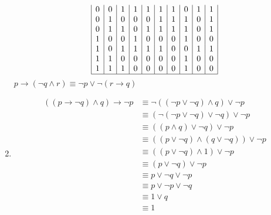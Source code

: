 \documentclass[12pt]{article}
\newcommand{\enumset}[1]{\setcounter{enumi}{#1}}
\begin{document}
\begin{enumerate}
\[\begin{array}{|*{10}{c|}}
					0 & 0 & 1 & 1 & 1 & 1 & 1 & 0 & 1 & 1 \\
					0 & 1 & 0 & 0 & 0 & 1 & 1 & 1 & 0 & 1 \\
					0 & 1 & 1 & 0 & 1 & 1 & 1 & 1 & 0 & 1 \\
					1 & 0 & 0 & 1 & 0 & 0 & 0 & 1 & 0 & 0 \\
					1 & 0 & 1 & 1 & 1 & 1 & 0 & 0 & 1 & 1 \\
					1 & 1 & 0 & 0 & 0 & 0 & 0 & 1 & 0 & 0 \\
					1 & 1 & 1 & 0 & 0 & 0 & 0 & 1 & 0 & 0 \\\hline
				\end{array}\]
				\(p \to (\lnot q \land r) \equiv \lnot p \lor \lnot(r \to q)\)
			\enumset{28}
			\item
				\begin{align*}
					((p \to \lnot q) \land q) \to \lnot p &\equiv \lnot((\lnot p \lor \lnot q) \land q) \lor \lnot p \tag{definition of \(\to\)} \\
						&\equiv (\lnot(\lnot p \lor \lnot q) \lor \lnot q) \lor \lnot p \tag{DeMorgan's law} \\
						&\equiv ((p \land q) \lor \lnot q) \lor \lnot p \tag{DeMorgan's law} \\
						&\equiv ((p \lor \lnot q) \land (q \lor \lnot q)) \lor \lnot p \tag{distributive property} \\
						&\equiv ((p \lor \lnot q) \land 1) \lor \lnot p \tag{tautology} \\
						&\equiv (p \lor \lnot q) \lor \lnot p \tag{identity} \\
						&\equiv p \lor \lnot q \lor \lnot p \tag{associativity} \\
						&\equiv p \lor \lnot p \lor \lnot q \tag{commutativity} \\
						&\equiv 1 \lor q \tag{tautology} \\
						&\equiv 1 \tag{domination}
				\end{align*}

		\end{enumerate}
\end{document}
